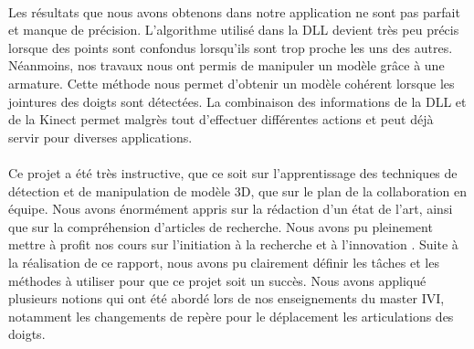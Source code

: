 \paragraph{}
Les résultats que nous avons obtenons dans notre application ne sont pas parfait et manque de précision. L'algorithme
utilisé dans la DLL devient très peu précis lorsque des points sont confondus lorsqu'ils sont trop proche les uns des autres.
Néanmoins, nos travaux nous ont permis de manipuler un modèle grâce à une armature. Cette méthode nous permet d'obtenir un 
modèle cohérent lorsque les jointures des doigts sont détectées. La combinaison des informations de la DLL et de la Kinect
permet malgrès tout d'effectuer différentes actions et peut déjà servir pour diverses applications.

\paragraph{}
Ce projet a été très instructive, que ce soit sur l'apprentissage des techniques de détection et de manipulation
de modèle 3D, que sur le plan de la collaboration en équipe. Nous avons énormément appris sur la rédaction d'un
état de l'art, ainsi que sur la compréhension d'articles de recherche. Nous avons pu pleinement mettre à profit
nos cours sur \og l'initiation à la recherche et à l'innovation \fg. Suite à la réalisation de ce rapport, nous avons pu
clairement définir les tâches et les méthodes à utiliser pour que ce projet soit un succès. Nous avons appliqué plusieurs
notions qui ont été abordé lors de nos enseignements du master IVI, notamment les changements de repère pour le déplacement
les articulations des doigts.
